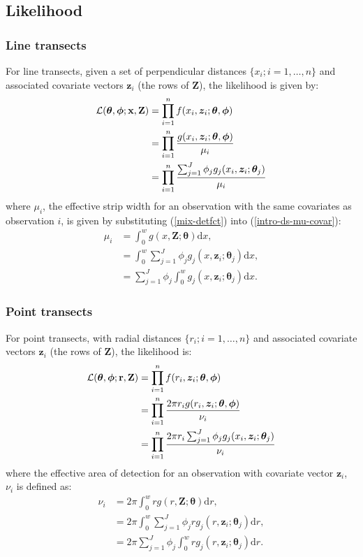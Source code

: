 \subsection{Likelihood}

\subsubsection{Line transects}

For line transects, given a set of perpendicular distances $\{x_i; i=1,\ldots,n\}$ and associated covariate vectors $\bm{z}_i$ (the rows of $\mathbf{Z}$), the likelihood is given by:
\begin{align}
\mathcal{L}(\bm{\theta},\bm{\phi}; \mathbf{x},\mathbf{Z}) &= \prod_{i=1}^n f(x_i,\bm{z}_i; \bm{\theta},\bm{\phi}) \notag \\
&= \prod_{i=1}^n \frac{g(x_i,\bm{z}_i; \bm{\theta},\bm{\phi})}{\mu_i} \notag \\
&= \prod_{i=1}^n \frac{\sum_{j=1}^J \phi_j g_j(x_i,\bm{z}_i; \bm{\theta}_j)}{\mu_i} \label{lt-lik}
\end{align}
where $\mu_i$, the effective strip width for an observation with the same covariates as observation $i$, is given by substituting (\ref{mix-detfct}) into (\ref{intro-ds-mu-covar}):
\begin{align*}
\mu_{i} &= \int_0^w  g(x,\bm{Z}; \bm{\theta}) \text{d}x,\\
& =  \int_0^w  \sum_{j=1}^J \phi_j g_j(x,\bm{z}_i; \bm{\theta}_j) \text{d}x,\\
& = \sum_{j=1}^J \phi_j \int_0^w  g_j(x,\bm{z}_i; \bm{\theta}_j) \text{d}x.
\end{align*}

\subsubsection{Point transects}

For point transects, with radial distances $\{r_i; i=1,\ldots,n\}$ and associated covariate vectors $\bm{z}_i$ (the rows of $\mathbf{Z}$), the likelihood is:
\begin{align}
\mathcal{L}(\bm{\theta},\bm{\phi}; \mathbf{r},\mathbf{Z}) &= \prod_{i=1}^n f(r_i,\bm{z}_i; \bm{\theta},\bm{\phi}) \notag \\
&= \prod_{i=1}^n \frac{2 \pi r_i g(r_i,\bm{z}_i; \bm{\theta},\bm{\phi})}{\nu_i} \notag \\
&= \prod_{i=1}^n \frac{2 \pi r_i \sum_{j=1}^J \phi_j g_j(x_i,\bm{z}_i; \bm{\theta}_j)}{\nu_i} \label{pt-lik}
\end{align}
where the effective area of detection for an observation with covariate vector $\mathbf{z}_i$, $\nu_i$ is defined as:
\begin{align*}
\nu_i &= 2\pi \int_0^w  r g(r,\bm{Z}; \bm{\theta}) \text{d}r,\\
& = 2\pi  \int_0^w  \sum_{j=1}^J \phi_j r g_j(r,\bm{z}_i; \bm{\theta}_j) \text{d}r,\\
& = 2\pi \sum_{j=1}^J \phi_j \int_0^w  r g_j(r,\bm{z}_i; \bm{\theta}_j) \text{d}r.
\end{align*}

